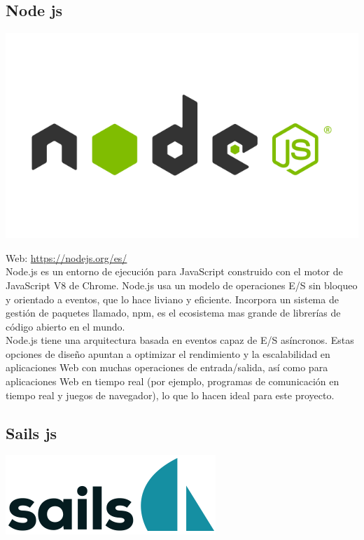 \subsection{Node js}

\begin{center}
\includegraphics[scale=0.3]{imagenes/nodejs-logo.png}
\end{center}

Web: \url{https://nodejs.org/es/}\\

Node.js es un entorno de ejecución para JavaScript construido con el motor de JavaScript V8 de Chrome. Node.js usa un modelo de operaciones E/S sin bloqueo y orientado a eventos, que lo hace liviano y eficiente. Incorpora un sistema de gestión de paquetes llamado, npm, es el ecosistema mas grande de librerías de código abierto en el mundo.\\

Node.js tiene una arquitectura basada en eventos capaz de E/S asíncronos. Estas opciones de diseño apuntan a optimizar el rendimiento y la escalabilidad en aplicaciones Web con muchas operaciones de entrada/salida, así como para aplicaciones Web en tiempo real (por ejemplo, programas de comunicación en tiempo real y juegos de navegador), lo que lo hacen ideal para este proyecto.\\


\subsection{Sails js}

\begin{center}
\includegraphics[scale=0.5]{imagenes/sailsjs-logo.png}
\end{center}

